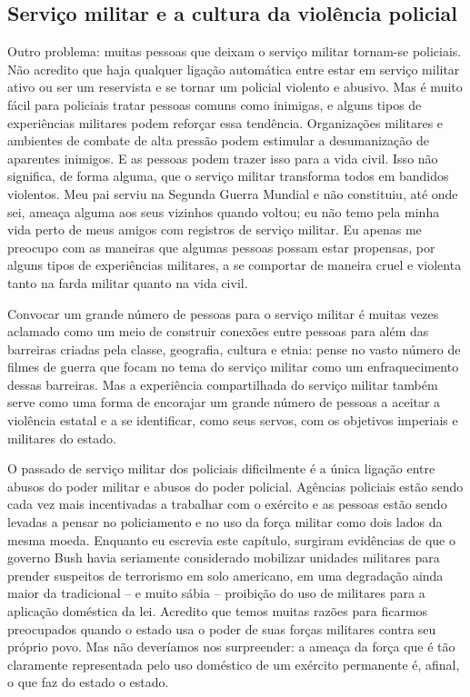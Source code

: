 \subsection*{Serviço militar e a cultura da violência policial}

Outro problema: muitas pessoas que deixam o serviço militar tornam-se policiais. Não acredito que haja qualquer ligação automática entre estar em serviço militar ativo ou ser um reservista e se tornar um policial violento e abusivo. Mas é muito fácil para policiais tratar pessoas comuns como inimigas, e alguns tipos de experiências militares podem reforçar essa tendência. Organizações militares e ambientes de combate de alta pressão podem estimular a desumanização de aparentes inimigos. E as pessoas podem trazer isso para a vida civil. Isso não significa, de forma alguma, que o serviço militar transforma todos em bandidos violentos. Meu pai serviu na Segunda Guerra Mundial e não constituiu, até onde sei, ameaça alguma aos seus vizinhos quando voltou; eu não temo pela minha vida perto de meus amigos com registros de serviço militar. Eu apenas me preocupo com as maneiras que algumas pessoas possam estar propensas, por alguns tipos de experiências militares, a se comportar de maneira cruel e violenta tanto na farda militar quanto na vida civil.

Convocar um grande número de pessoas para o serviço militar é muitas vezes aclamado como um meio de construir conexões entre pessoas para além das barreiras criadas pela classe, geografia, cultura e etnia: pense no vasto número de filmes de guerra que focam no tema do serviço militar como um enfraquecimento dessas barreiras. Mas a experiência compartilhada do serviço militar também serve como uma forma de encorajar um grande número de pessoas a aceitar a violência estatal e a se identificar, como seus servos, com os objetivos imperiais e militares do estado.

O passado de serviço militar dos policiais dificilmente é a única ligação entre abusos do poder militar e abusos do poder policial. Agências policiais estão sendo cada vez mais incentivadas a trabalhar com o exército e as pessoas estão sendo levadas a pensar no policiamento e no uso da força militar como dois lados da mesma moeda. Enquanto eu escrevia este capítulo, surgiram evidências de que o governo Bush havia seriamente considerado mobilizar unidades militares para prender suspeitos de terrorismo em solo americano, em uma degradação ainda maior da tradicional -- e muito sábia -- proibição do uso de militares para a aplicação doméstica da lei. Acredito que temos muitas razões para ficarmos preocupados quando o estado usa o poder de suas forças militares contra seu próprio povo. Mas não deveríamos nos surpreender: a ameaça da força que é tão claramente representada pelo uso doméstico de um exército permanente é, afinal, o que faz do estado o estado.

